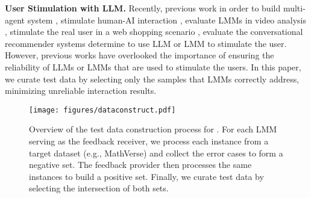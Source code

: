 \textbf{User Stimulation with LLM.} Recently, previous work in order to build multi-agent system \citep{khan2024debatingpersuasivellmsleads}, stimulate human-AI interaction \citep{yao2025taubench}, evaluate LMMs in video analysis \citep{VideoAutoArena}, stimulate the real user in a web shopping scenario \cite{chatshop}, evaluate the conversational recommender systems \citep{yoon-etal-2024-evaluating} determine to use LLM or LMM to stimulate the user. However, previous works have overlooked the importance of ensuring the reliability of LLMs or LMMs that are used to stimulate the users. In this paper, we curate test data by selecting only the samples that LMMs correctly address, minimizing unreliable interaction results.



\begin{figure*}[!t]
    \centering
    \texttt{[image: figures/dataconstruct.pdf]}
    \vspace{-1mm}
    \caption{Overview of the test data construction process for \bench{}. For each LMM serving as the feedback receiver, we process each instance from a target dataset (e.g., MathVerse) and collect the error cases to form a negative set. The feedback provider then processes the same instances to build a positive set. Finally, we curate test data by selecting the intersection of both sets.}
    \label{fig:dataconstruct}
\end{figure*}